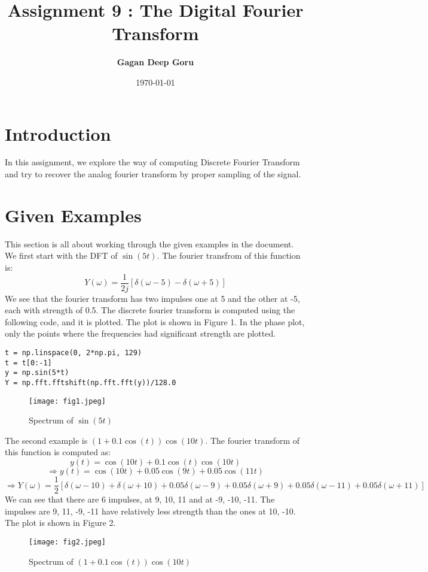 \documentclass[12pt, a4paper]{article}
\title{\textbf{Assignment 9 : The Digital Fourier Transform}} %
\author{\textbf{Gagan Deep Goru}} %
\date{\today} %
\begin{document}
		
\maketitle %
\section*{Introduction} 
In this assignment, we explore the way of computing Discrete Fourier Transform and try to recover the analog fourier transform by proper sampling of the signal.
\section{Given Examples}
This section is all about working through the given examples in the document. We first start with the DFT of $\sin(5t)$. The fourier transfrom of this function is:
\begin{equation*}
Y(\omega) = \frac{1}{2j}[\delta(\omega - 5) - \delta(\omega + 5)]
\end{equation*}
We see that the fourier transform has two impulses one at 5 and the other at -5, each with strength of 0.5. The discrete fourier transform is computed using the following code, and it is plotted. The plot is shown in Figure 1. In the phase plot, only the points where the frequencies had significant strength are plotted.\\

\lstset{language=Python}
\lstset{frame = lines}
\lstset{basicstyle=\footnotesize}
\begin{lstlisting}	
t = np.linspace(0, 2*np.pi, 129)
t = t[0:-1]
y = np.sin(5*t)
Y = np.fft.fftshift(np.fft.fft(y))/128.0
\end{lstlisting}

\begin{figure}
\texttt{[image: fig1.jpeg]}
\caption{Spectrum of $\sin(5t)$}
\end{figure}

\begin{flushleft}
The second example is $(1 + 0.1\cos(t))\cos(10t)$. The fourier transform of this function is computed as:
\begin{equation*}
y(t) = \cos(10t) + 0.1\cos(t)\cos(10t)
\end{equation*}
\begin{equation*}
\Rightarrow y(t) = \cos(10t) + 0.05\cos(9t) + 0.05\cos(11t)
\end{equation*}
\begin{equation*}
\Rightarrow Y(\omega) = \frac{1}{2}[\delta(\omega - 10) + \delta(\omega + 10) + 0.05\delta(\omega - 9) + 0.05\delta(\omega + 9) + 0.05\delta(\omega - 11) + 0.05\delta(\omega + 11)]
\end{equation*}
We can see that there are 6 impulses, at 9, 10, 11 and at -9, -10, -11. The impulses are 9, 11, -9, -11 have relatively less strength than the ones at 10, -10. The plot is shown in Figure 2.
\end{flushleft}
\begin{figure}
\texttt{[image: fig2.jpeg]}
\caption{Spectrum of $(1 + 0.1\cos(t))\cos(10t)$}
\end{figure}
\end{document}
